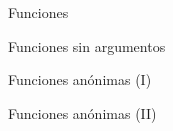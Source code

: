 \documentclass[8pt]{extarticle}
\begin{document}
\begin{multicols}{3}
        \begin{exampleBlock}{Funciones}
        \end{exampleBlock}

        \begin{exampleBlock}{Funciones sin argumentos}
        \end{exampleBlock}




        \begin{exampleBlock}{Funciones an\'onimas (I)}
        \end{exampleBlock}

        \begin{exampleBlock}{Funciones an\'onimas (II)}
        \end{exampleBlock}

    \end{multicols}
    
    \newpage


    \vspace*{0.5cm}
\end{document}
